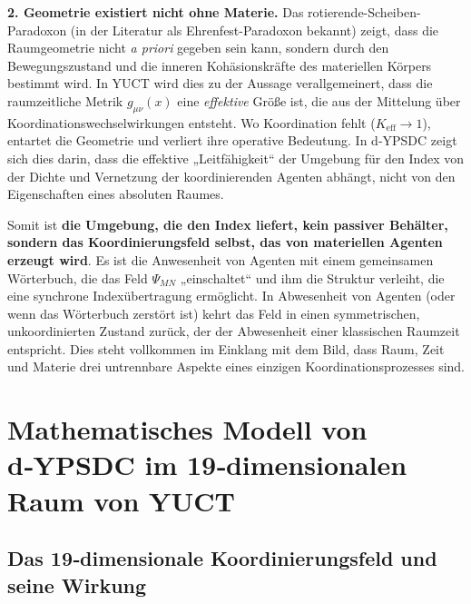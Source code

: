 \documentclass[12pt,a4paper]{article}
\begin{document}
	\textbf{2. Geometrie existiert nicht ohne Materie.} Das rotierende-Scheiben-Paradoxon (in der Literatur als Ehrenfest-Paradoxon bekannt) zeigt, dass die Raumgeometrie nicht \emph{a priori} gegeben sein kann, sondern durch den Bewegungszustand und die inneren Kohäsionskräfte des materiellen Körpers bestimmt wird. In YUCT wird dies zu der Aussage verallgemeinert, dass die raumzeitliche Metrik \(g_{\mu\nu}(x)\) eine \emph{effektive} Größe ist, die aus der Mittelung über Koordinationswechselwirkungen entsteht. Wo Koordination fehlt (\(K_{\mathrm{eff}} \to 1\)), entartet die Geometrie und verliert ihre operative Bedeutung. In d‑YPSDC zeigt sich dies darin, dass die effektive „Leitfähigkeit“ der Umgebung für den Index von der Dichte und Vernetzung der koordinierenden Agenten abhängt, nicht von den Eigenschaften eines absoluten Raumes.
	
	Somit ist \textbf{die Umgebung, die den Index liefert, kein passiver Behälter, sondern das Koordinierungsfeld selbst, das von materiellen Agenten erzeugt wird}. Es ist die Anwesenheit von Agenten mit einem gemeinsamen Wörterbuch, die das Feld \(\Psi_{MN}\) „einschaltet“ und ihm die Struktur verleiht, die eine synchrone Indexübertragung ermöglicht. In Abwesenheit von Agenten (oder wenn das Wörterbuch zerstört ist) kehrt das Feld in einen symmetrischen, unkoordinierten Zustand zurück, der der Abwesenheit einer klassischen Raumzeit entspricht. Dies steht vollkommen im Einklang mit dem Bild, dass Raum, Zeit und Materie drei untrennbare Aspekte eines einzigen Koordinationsprozesses sind.
	
	\section{Mathematisches Modell von d‑YPSDC im 19‑dimensionalen Raum von YUCT}
	\label{sec:math-model}
	
	\subsection{Das 19‑dimensionale Koordinierungsfeld und seine Wirkung}
	
\end{document}
